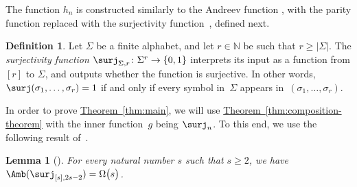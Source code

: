 \documentclass[11pt]{article}
\numberwithin{equation}{section}
\newtheorem{lemma}[theorem]{Lemma}
\theoremstyle{definition}
\newtheorem{definition}[theorem]{Definition}
\theoremstyle{plain}
\newcommand{\N}{\mathbb N}
\newcommand{\expref}[2]{\hyperref[#2]{#1~\ref{#2}}}
\theoremstyle{definition}\newtheorem{notation}[theorem]{Notation}\theoremstyle{plain}
\begin{document}
The function $h_{n}$ is constructed similarly to the Andreev function
\cite{A87}, with the parity function replaced with the surjectivity
function~\cite{BM12}, defined next.
\begin{definition}
\label{def:surjectivity}Let $\Sigma$ be a finite alphabet, and let $r\in\N$
be such that $r\ge\left|\Sigma\right|$. The \emph{surjectivity function}
$\surj_{\Sigma,r}\colon\Sigma^{r}\to\{0,1\}$ interprets its input
as a function from $\left[r\right]$ to $\Sigma$, and outputs whether
the function is surjective. In other words, $\surj(\sigma_{1},\ldots,\sigma_{r})=1$
if and only if every symbol in~$\Sigma$ appears in~$(\sigma_{1},\ldots,\sigma_{r})$.
\end{definition}

In order to prove \expref{Theorem}{thm:main}, we will use \expref{Theorem}{thm:composition-theorem}
with the inner function~$g$ being $\surj_{n}$. To this end, we
use the following result of~\cite{BM12}.
\begin{lemma}[\cite{BM12}]
\label{lemma:surj-amb}For every natural number $s$ such that $s\ge2$,
we have $\Amb(\surj_{\left[s\right],2s-2})=\Omega\bigl(s\bigr)$. 
\end{lemma}
\end{document}
